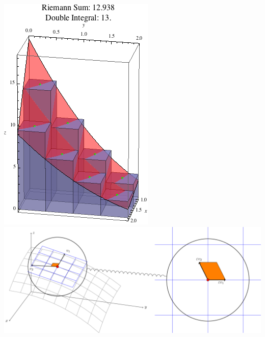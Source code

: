 \documentclass[20pt,margin=1in,innermargin=-4.5in,blockverticalspace=-0.25in]{tikzposter}
\begin{document}
\begin{columns}
{\begin{itemize}
\begin{center}
                \includegraphics[scale=0.5]{riemannint.png} \quad \quad \quad \quad \quad \quad \quad \quad \quad
                \includegraphics[scale=0.5]{tangentareaelement.png}
            \end{center}




\end{itemize}}
\end{columns}
\end{document}
